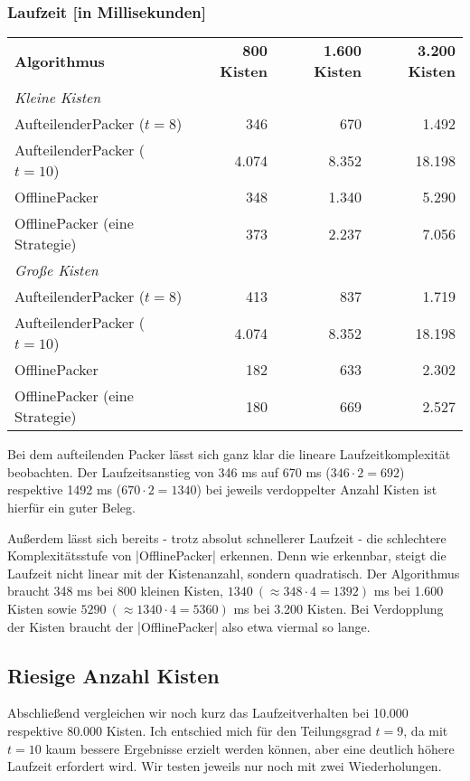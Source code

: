 \subsubsection*{Laufzeit [in Millisekunden]}
\begin{center}
\begin{tabular}{lrrr}
\vspace*{.42em}
\textbf{Algorithmus} 	& \textbf{800 Kisten} 	& \textbf{1.600 Kisten} & \textbf{3.200 Kisten} \\
\textit{Kleine Kisten} & & & \\
 AufteilenderPacker ($t=8$)	& 346		& 670			& 1.492			\\
 AufteilenderPacker ($t=10$)  	& 4.074		& 8.352			& 18.198			\\
 OfflinePacker			& 348		& 1.340			& 5.290			\\
 OfflinePacker (eine Strategie)	& 373		& 2.237			& 7.056			\\
\vspace*{.42em}
\textit{Große Kisten} & & & \\
 AufteilenderPacker ($t=8$)  	& 413		& 837			& 1.719			\\
 AufteilenderPacker ($t=10$)  	& 4.074		& 8.352			& 18.198			\\
 OfflinePacker			& 182		& 633			& 2.302			\\
 OfflinePacker (eine Strategie)	& 180		& 669			& 2.527			\\
\end{tabular}
\end{center}
 Bei dem aufteilenden Packer lässt sich ganz klar die lineare Laufzeitkomplexität beobachten.
 Der Laufzeitsanstieg von 346 ms auf 670 ms ($346 \cdot 2 = 692$) respektive 1492 ms ($670 \cdot 2 = 1340$) bei jeweils verdoppelter Anzahl Kisten ist hierfür ein guter Beleg.

 Außerdem lässt sich bereits - trotz absolut schnellerer Laufzeit - die schlechtere Komplexitätsstufe von |OfflinePacker| erkennen.
 Denn wie erkennbar, steigt die Laufzeit nicht linear mit der Kistenanzahl, sondern quadratisch.
 Der Algorithmus braucht 348 ms bei 800 kleinen Kisten, $1340\ (\approx 348 \cdot 4 = 1392)$ ms bei 1.600 Kisten sowie $5290\ (\approx 1340 \cdot 4 = 5360)$ ms bei 3.200 Kisten.
 Bei Verdopplung der Kisten braucht der |OfflinePacker| also etwa viermal so lange.

\clearpage
\subsection{Riesige Anzahl Kisten}
 Abschließend vergleichen wir noch kurz das Laufzeitverhalten bei 10.000 respektive 80.000 Kisten.
 Ich entschied mich für den Teilungsgrad $t=9$, da mit $t=10$ kaum bessere Ergebnisse erzielt werden können, aber eine deutlich höhere Laufzeit erfordert wird.
 Wir testen jeweils nur noch mit zwei Wiederholungen.

